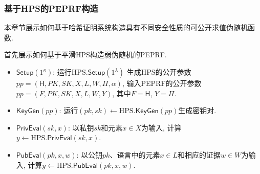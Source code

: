 \subsubsection{基于HPS的PEPRF构造}
本章节展示如何基于哈希证明系统构造具有不同安全性质的可公开求值伪随机函数. 

首先展示如何基于平滑HPS构造弱伪随机的PEPRF.  
\begin{construction}[基于平滑HPS的PEPRF构造]\label{construction:SHPS-to-PEPRF}
\begin{itemize}
\item $\mathsf{Setup}(1^\kappa)$: 运行$\text{HPS}.\mathsf{Setup}(1^\lambda)$
    生成HPS的公开参数$pp = (\mathsf{H}, PK, SK, X, L, W, \Pi, \alpha)$, 
    输入PEPRF的公开参数$pp = (F, PK, SK, X, L, W, Y)$, 其中$F = \mathsf{H}$, $Y = \Pi$.  

\item $\mathsf{KeyGen}(pp)$: 运行$(pk, sk) \leftarrow \text{HPS}.\mathsf{KeyGen}(pp)$生成密钥对.  

\item $\mathsf{PrivEval}(sk, x)$: 以私钥$sk$和元素$x \in X$为输入, 计算$y \leftarrow \text{HPS}.\mathsf{PrivEval}(sk, x)$. 

\item $\mathsf{PubEval}(pk, x, w)$: 以公钥$pk$、语言中的元素$x \in L$和相应的证据$w \in W$为输入, 
    计算$y \leftarrow \text{HPS}.\mathsf{PubEval}(pk, x, w)$. 
\end{itemize}
\end{construction}  

